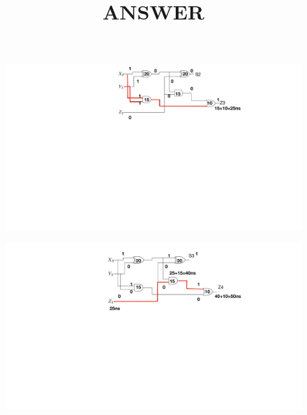 \documentclass{article}
\begin{document}
         \begin{answer}
        \title {ANSWER} \begin{figure}[!ht]
    \centerline{\includegraphics[scale=.5]{quad1.pdf}}
		\caption{}
	\label{quad1.pdf}
\end{figure}
        
   \begin{figure}[!ht]
    	\centerline{\includegraphics[scale=.5]{quad2.pdf}}
    	\caption{}
   

\end{figure}
\end{answer}
\end{document}
